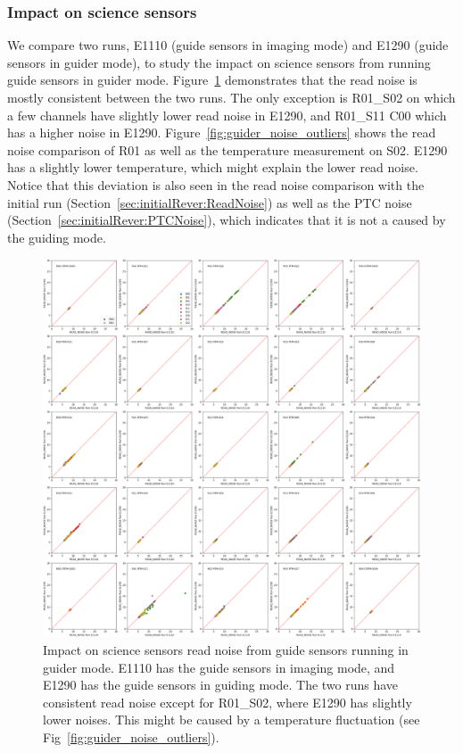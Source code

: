 \subsubsection{Impact on science sensors}\label{sec:guiderimpactonscience}
We compare two runs, E1110 (guide sensors in imaging mode) and E1290 (guide sensors in guider mode), to study the impact on science sensors from running guide sensors in guider mode. Figure~\ref{fig:guider_noise} demonstrates that the read noise is mostly consistent between the two runs. The only exception is R01\_S02 on which a few channels have slightly lower read noise in E1290, and R01\_S11 C00 which has a higher noise in E1290. Figure~\ref{fig:guider_noise_outliers} shows the read noise comparison of R01 as well as the temperature measurement on S02. E1290 has a slightly lower temperature, which might explain the lower read noise. Notice that this deviation is also seen in the read noise comparison with the initial run (Section~\ref{sec:initialRever:ReadNoise}) as well as the PTC noise (Section~\ref{sec:initialRever:PTCNoise}), which indicates that it is not a caused by the guiding mode.
\begin{figure}[ht]
    \centering
    \includegraphics[width=0.95\linewidth]{figures/E1110_E1290_READ_NOISE.png}
    \caption{Impact on science sensors read noise from guide sensors running in guider mode. E1110 has the guide sensors in imaging mode, and E1290 has the guide sensors in guiding mode. The two runs have consistent read noise except for R01\_S02, where E1290 has slightly lower noises. This might be caused by a temperature fluctuation (see Fig~\ref{fig:guider_noise_outliers}).}
    \label{fig:guider_noise}
\end{figure}


